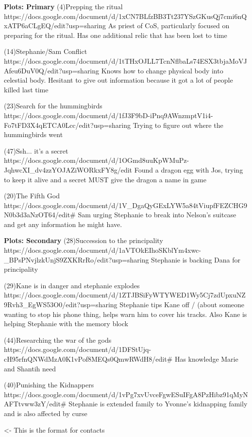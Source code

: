 \documentclass[char]{GL2020}
\begin{document}
\textbf{Plots: Primary}
(4)Prepping the ritual
https://docs.google.com/document/d/1xCN7BLfzBB3Tt237YSzGKusQj7cmi6nQxATP6aCLgEQ/edit?usp=sharing
As priest of CoS, particularly focused on preparing for the ritual.  Has one additional relic that has been lost to time

(14)Stephanie/Sam Conflict
https://docs.google.com/document/d/1tTHxOJLL7TcnNflbaLs74ESX3tbjaMoVJAfeu6DuV0Q/edit?usp=sharing
Knows how to change physical body into celestial body.  Hesitant to give out information because it got a lot of people killed last time

(23)Search for the hummingbirds
https://docs.google.com/document/d/1fJ3F9bD-iPnq9AWnzmptV1i4-Fo7tFD3X4qETCA0Lcc/edit?usp=sharing
Trying to figure out where the hummingbirds went

(47)Ssh... it's a secret
https://docs.google.com/document/d/1OGmd8uuKpWMuPz-JqhwcXI_dv4zzYOJAZiWORkxFY8g/edit
Found a dragon egg with Jos, trying to keep it alive and a secret
MUST give the dragon a name in game

(20)The Fifth God
https://docs.google.com/document/d/1V_DgaQyGExLYW5a84tViupfFEZCHG9N0b3d3aNzOT64/edit#
Sam urging Stephanie to break into Nelson’s suitcase and get any information he might have.

\textbf{Plots: Secondary}
(28)Succession to the principality
https://docs.google.com/document/d/1aVTOkEIhoSKblYm4xwc-_BPsPNvjlzkUnjS9ZXKRrRo/edit?usp=sharing
Stephanie is backing Dana for principality

(29)Kane is in danger and stephanie explodes
https://docs.google.com/document/d/1ZTJBSiFyWTYWED1Wy5Cj7zdUpxuNZ9Rvh3_EgWS53O0/edit?usp=sharing
Stephanie \cDisney{} tips Kane \cTechStar{} off / (about someone wanting to stop his phone thing, helps warn him to cover his tracks. Also Kane is helping Stephanie with the memory block

(44)Researching the war of the gods
https://docs.google.com/document/d/1DFStUjq-cH95rfnQNWdMzA0K1vPof8MEQs0QmwRWdH8/edit#
Has knowledge Marie and Shantih need

(40)Punishing the Kidnappers
https://docs.google.com/document/d/1vPg7xvUvceFgwESuIFgA8PzHibz91qMyNAFTtvww3zY/edit#
Stephanie is extended family to Yvonne's kidnapping family and is also affected by curse


\begin{itemz}[Goals]
	\item 
\end{itemz}

\begin{itemz}[Notes]
	\item 
\end{itemz}

\begin{contacts}
	\contact{\cTest{}} <- This is the format for contacts 
\end{contacts}
\end{document}
